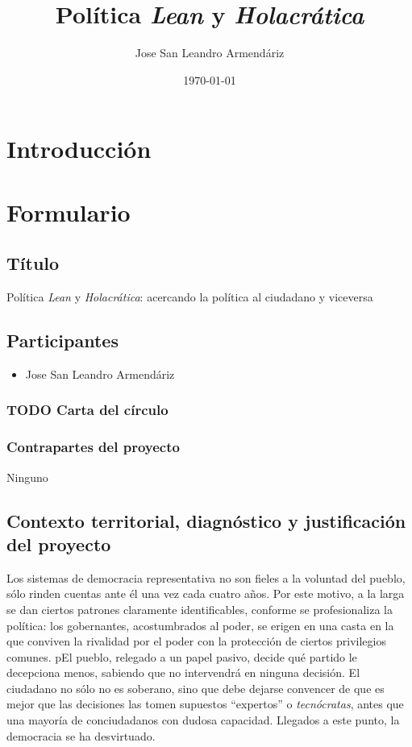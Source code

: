 \documentclass[11pt]{article}
\author{Jose San Leandro Armendáriz}
\date{\today}
\title{Política \emph{Lean} y \emph{Holacrática}}
\begin{document}
\maketitle
\tableofcontents

\section{Introducción}
\label{sec-1}
\section{Formulario}
\label{sec-2}
\subsection{Título}
\label{sec-2-1}
Política \emph{Lean} y \emph{Holacrática}: acercando la política al ciudadano y viceversa
\subsection{Participantes}
\label{sec-2-2}
\begin{itemize}
\item Jose San Leandro Armendáriz
\end{itemize}
\subsubsection{{\bfseries\sffamily TODO} Carta del círculo}
\label{sec-2-2-1}
\subsubsection{Contrapartes del proyecto}
\label{sec-2-2-2}
Ninguno
\subsection{Contexto territorial, diagnóstico y justificación del proyecto}
\label{sec-2-3}
Los sistemas de democracia representativa no son fieles a la voluntad del pueblo, sólo rinden cuentas ante él una vez cada cuatro años.
Por este motivo, a la larga se dan ciertos patrones claramente identificables, conforme se profesionaliza la política: los gobernantes, acostumbrados al poder, se erigen en una casta en la que conviven la rivalidad por el poder con la protección de ciertos privilegios comunes.
pEl pueblo, relegado a un papel pasivo, decide qué partido le decepciona menos, sabiendo que no intervendrá en ninguna decisión. El ciudadano no sólo no es soberano, sino que debe dejarse convencer de que es mejor que las decisiones las tomen supuestos ``expertos'' o \emph{tecnócratas}, antes que una mayoría de conciudadanos con dudosa capacidad.
Llegados a este punto, la democracia se ha desvirtuado.
\end{document}
